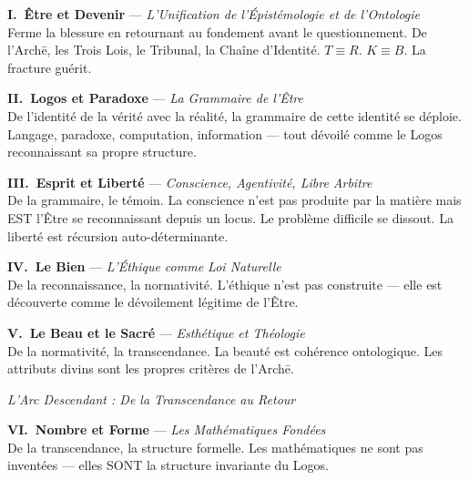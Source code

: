 \documentclass[10pt, openany, oneside]{book}
\begin{document}
\vspace{0.5em}

\noindent \textbf{I.\ Être et Devenir} --- \textit{L'Unification de l'Épistémologie et de l'Ontologie}\\
Ferme la blessure en retournant au fondement avant le questionnement. De l'Arch\={e}, les Trois Lois, le Tribunal, la Chaîne d'Identité. $T \equiv R$. $K \equiv B$. La fracture guérit.

\vspace{0.5em}

\noindent \textbf{II.\ Logos et Paradoxe} --- \textit{La Grammaire de l'Être}\\
De l'identité de la vérité avec la réalité, la grammaire de cette identité se déploie. Langage, paradoxe, computation, information --- tout dévoilé comme le Logos reconnaissant sa propre structure.

\vspace{0.5em}

\noindent \textbf{III.\ Esprit et Liberté} --- \textit{Conscience, Agentivité, Libre Arbitre}\\
De la grammaire, le témoin. La conscience n'est pas produite par la matière mais EST l'Être se reconnaissant depuis un locus. Le problème difficile se dissout. La liberté est récursion auto-déterminante.

\vspace{0.5em}

\noindent \textbf{IV.\ Le Bien} --- \textit{L'Éthique comme Loi Naturelle}\\
De la reconnaissance, la normativité. L'éthique n'est pas construite --- elle est découverte comme le dévoilement légitime de l'Être.

\vspace{0.5em}

\noindent \textbf{V.\ Le Beau et le Sacré} --- \textit{Esthétique et Théologie}\\
De la normativité, la transcendance. La beauté est cohérence ontologique. Les attributs divins sont les propres critères de l'Arch\={e}.

\vspace{1.5em}

\begin{center}
    \itshape L'Arc Descendant : De la Transcendance au Retour
\end{center}

\vspace{0.5em}

\noindent \textbf{VI.\ Nombre et Forme} --- \textit{Les Mathématiques Fondées}\\
De la transcendance, la structure formelle. Les mathématiques ne sont pas inventées --- elles SONT la structure invariante du Logos.
\end{document}
